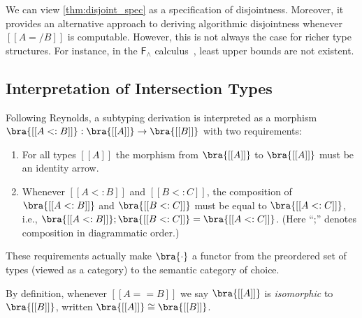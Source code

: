 \begin{remark}
We can view \cref{thm:disjoint_spec} as a specification of disjointness. Moreover, it
provides an alternative approach to deriving algorithmic disjointness whenever
$[[A =/ B]]$ is computable. However, this is not always the case for richer type
structures. For instance, in the $\mathsf{F}_{\land}$ calculus~\citep{pierce1991programming}, least
upper bounds are not existent.
\end{remark}








\subsection{Interpretation of Intersection Types}

Following Reynolds, a subtyping derivation is interpreted as a morphism $ \bra{[[ A <: B ]]} : \bra{[[A]]} \rightarrow \bra{[[B]]} $ with two requirements:
\begin{enumerate}
\item For all types $[[A]]$ the morphism from $ \bra{[[A]]}$ to $\bra{[[A]]}$ must be an identity arrow.
\item Whenever $[[A <: B]]$ and $[[ B <: C  ]]$, the composition of $\bra{[[ A <: B ]]}$ and $\bra{[[  B <: C   ]]}$ must be equal to $\bra{[[  A <: C  ]]}$, i.e., $ \bra{[[ A <: B ]]} ; \bra{[[  B <: C  ]]} = \bra{[[A <: C]]}$. (Here ``;'' denotes composition in diagrammatic order.)
\end{enumerate}
These requirements actually make $ \bra{\cdot} $ a functor from the
preordered set of types (viewed as a category) to the semantic category of
choice.

\begin{remark}
By definition, whenever $[[ A == B ]]$ we say $\bra{[[  A  ]]}$ is \emph{isomorphic} to $\bra{[[ B ]]}$, written $\bra{[[ A ]]} \cong \bra{[[B]]}$.
\end{remark}

